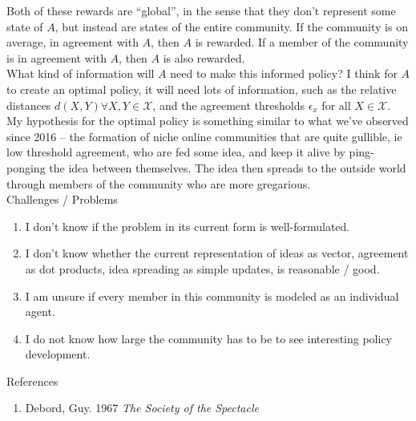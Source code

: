 \documentclass{article}
\begin{document}
\begin{flushleft}
Both of these rewards are ``global'', in the sense that they don't represent some state of $A$, but instead are states of the entire community. If the community is on average, in agreement with $A$, then $A$ is rewarded. If a member of the community is in agreement with $A$, then $A$ is also rewarded.\\
\vspace{5pt}
What kind of information will $A$ need to make this informed policy? I think for $A$ to create an optimal policy, it will need lots of information, such as the relative distances $d(X,Y)  \forall X,Y \in \mathcal{X}$, and the agreement thresholds $\epsilon_x$ for all $X \in \mathcal{X}$.\\
\vspace{5pt}
My hypothesis for the optimal policy is something similar to what we've observed since 2016 -- the formation of niche online communities that are quite gullible, ie low threshold agreement, who are fed some idea, and keep it alive by ping-ponging the idea between themselves. The idea then spreads to the outside world through members of the community who are more gregarious.\\
\vspace{10pt}
Challenges / Problems
\begin{enumerate}
\item I don't know if the problem in its current form is well-formulated.
\item I don't know whether the current representation of ideas as vector, agreement as dot products, idea spreading as simple updates, is reasonable / good.
\item I am unsure if every member in this community is modeled as an individual agent.
\item I do not know how large the community has to be to see interesting policy development.
\end{enumerate}

References\\
\begin{enumerate}
    \item Debord, Guy. 1967 \textit{The Society of the Spectacle}
\end{enumerate}

\end{flushleft}
\end{document}
